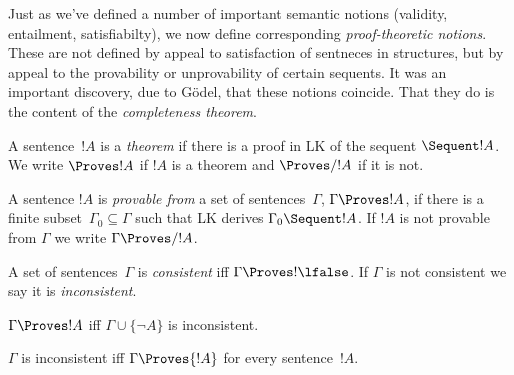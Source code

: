 \documentclass[../../include/open-logic-section]{subfiles}
\begin{document}

\begin{wordy}
Just as we've defined a number of important semantic notions
(validity, entailment, satisfiabilty), we now define corresponding
\emph{proof-theoretic notions}. These are not defined by appeal to
satisfaction of sentneces in structures, but by appeal to the
provability or unprovability of certain sequents.  It was an important
discovery, due to G\"odel, that these notions coincide.  That they do
is the content of the \emph{completeness theorem}.
\end{wordy}

\begin{defn}[Theorems]
A sentence~$!A$ is a \emph{theorem} if there is a proof in LK of the
sequent $\Sequent !A$. We write $\Proves !A$ if $!A$ is a theorem and
$\Proves/ !A$ if it is not.
\end{defn}

\begin{defn}[Provability]
A sentence $!A$ is \emph{provable from} a set of sentences~$\Gamma$,
$\Gamma \Proves !A$, if there is a finite subset~$\Gamma_0 \subseteq
\Gamma$ such that LK derives $\Gamma_0 \Sequent !A$.  If $!A$ is not
provable from $\Gamma$ we write $\Gamma \Proves/ !A$.
\end{defn}

\begin{defn}[Consistency]
A set of sentences~$\Gamma$ is \emph{consistent} iff $\Gamma \Proves!
\lfalse$.  If $\Gamma$ is not consistent we say it is \emph{inconsistent}.
\end{defn}

\begin{prop}
$\Gamma \Proves !A$ iff $\Gamma \cup \{\lnot A\}$ is inconsistent.
\end{prop}

\begin{prop}
$\Gamma$ is inconsistent iff $\Gamma \Proves {!A}$ for every sentence~$!A$.
\end{prop}
\end{document}

